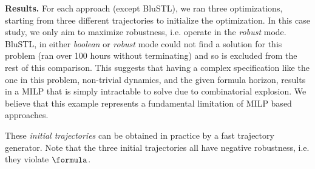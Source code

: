 
\textbf{Results.}
For each approach (except BluSTL), we ran three optimizations, starting from three different trajectories to initialize the optimization. In this case study, we only aim to maximize robustness, i.e. operate in the \textit{robust} mode. BluSTL, in either \textit{boolean} or \textit{robust} mode could not find a solution for this problem (ran over 100 hours without terminating) and so is excluded from the rest of this comparison. This suggests that having a complex specification like the one in this problem, non-trivial dynamics, and the given formula horizon, results in a MILP that is simply intractable to solve due to combinatorial explosion. We believe that this example represents a fundamental limitation of MILP based approaches.

These \textit{initial trajectories} can be obtained in practice by a fast trajectory generator. Note that the three initial trajectories all have negative robustness, i.e. they violate $\formula$.


